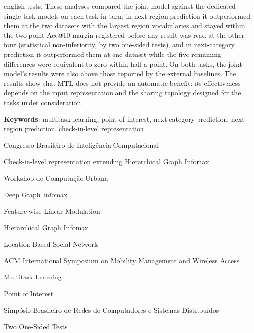 \begin{resumo}[Abstract]
\begin{otherlanguage*}{english}
            tests. These analyses compared the joint model against the
            dedicated single-task models on each task in turn: in next-region
            prediction it outperformed them at the two datasets with the largest region
            vocabularies and stayed within the two-point Acc@10 margin registered before
            any result was read at the other four (statistical non-inferiority, by two one-sided tests), and in next-category prediction it
            outperformed them at one dataset while the five remaining differences were
            equivalent to zero within half a point. On both tasks, the joint
            model's results were also above those reported by the external baselines.
            The results
            show that MTL does not
            provide an automatic benefit: its effectiveness depends on the input
            representation and the sharing topology designed for the tasks under
            consideration.

            \vspace{\onelineskip}
            \noindent
            \begin{minipage}{\linewidth}
                \textbf{Keywords}:
                multitask learning, point of interest, next-category prediction,
                next-region prediction, check-in-level representation
            \end{minipage}
        \end{otherlanguage*}
    \end{resumo}
    \else
    \pagestyle{empty}
    \fi

    \listoffigures*
    \cleardoublepage

    \listoftables*
    \cleardoublepage

    \begin{siglas}
        \item[CBIC] Congresso Brasileiro de Intelig\^encia Computacional
        \item[Check2HGI] Check-in-level representation extending Hierarchical Graph Infomax
        \item[CoUrb] Workshop de Computa\c{c}\~ao Urbana
        \item[DGI] Deep Graph Infomax
        \item[FiLM] Feature-wise Linear Modulation
        \item[HGI] Hierarchical Graph Infomax
        \item[LBSN] Location-Based Social Network
        \item[MobiWac] ACM International Symposium on Mobility Management and Wireless Access
        \item[MTL] Multitask Learning
        \item[POI] Point of Interest
        \item[SBRC] Simp\'osio Brasileiro de Redes de Computadores e Sistemas Distribu\'idos
        \item[TOST] Two One-Sided Tests
    \end{siglas}
    \cleardoublepage

